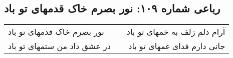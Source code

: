 \begin{center}
\section*{رباعی شماره ۱۰۹: نور بصرم خاک قدمهای تو باد}
\label{sec:sh109}
\begin{longtable}{l p{0.5cm} r}
نور بصرم خاک قدمهای تو باد
&&
آرام دلم زلف به خمهای تو باد
\\
در عشق داد من ستمهای تو باد
&&
جانی دارم فدای غمهای تو باد
\\
\end{longtable}
\end{center}
